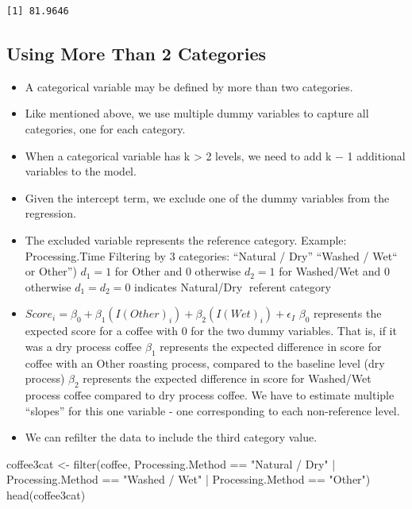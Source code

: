 \documentclass[
  letterpaper,
  DIV=11,
  numbers=noendperiod]{scrreprt}
\newenvironment{Shaded}{\begin{snugshade}}{\end{snugshade}}
\newcommand{\FunctionTok}[1]{\textcolor[rgb]{0.28,0.35,0.67}{#1}}
\newcommand{\NormalTok}[1]{\textcolor[rgb]{0.00,0.23,0.31}{#1}}
\newcommand{\OtherTok}[1]{\textcolor[rgb]{0.00,0.23,0.31}{#1}}
\newcommand{\SpecialCharTok}[1]{\textcolor[rgb]{0.37,0.37,0.37}{#1}}
\newcommand{\StringTok}[1]{\textcolor[rgb]{0.13,0.47,0.30}{#1}}
\begin{document}
\begin{verbatim}
[1] 81.9646
\end{verbatim}

\subsection{Using More Than 2
Categories}\label{using-more-than-2-categories}

\begin{itemize}
\item
  A categorical variable may be defined by more than two categories.
\item
  Like mentioned above, we use multiple dummy variables to capture all
  categories, one for each category.
\item
  When a categorical variable has k \textgreater{} 2 levels, we need to
  add k − 1 additional variables to the model.
\item
  Given the intercept term, we exclude one of the dummy variables from
  the regression.
\item
  The excluded variable represents the reference category. Example:
  Processing.Time Filtering by 3 categories: ``Natural / Dry'' ``Washed
  / Wet`` or Other'') \(d_1=1\) for Other and 0 otherwise \(d_2=1\) for
  Washed/Wet and 0 otherwise \(d_1=d_2=0\) indicates Natural/Dry
  referent category
\item
  \(Score_i=β_0+β_1(I(Other)_i)+β_2(I(Wet)_i)+ϵ_I\) \(β_0\) represents
  the expected score for a coffee with 0 for the two dummy variables.
  That is, if it was a dry process coffee \(β_1\) represents the
  expected difference in score for coffee with an Other roasting
  process, compared to the baseline level (dry process) \(β_2\)
  represents the expected difference in score for Washed/Wet process
  coffee compared to dry process coffee. We have to estimate multiple
  ``slopes'' for this one variable - one corresponding to each
  non-reference level.
\item
  We can refilter the data to include the third category value.
\end{itemize}

\begin{Shaded}
\begin{Highlighting}[]
\NormalTok{coffee3cat }\OtherTok{\textless{}{-}} \FunctionTok{filter}\NormalTok{(coffee, Processing.Method }\SpecialCharTok{==} \StringTok{"Natural / Dry"} \SpecialCharTok{|}\NormalTok{ Processing.Method }\SpecialCharTok{==}
    \StringTok{"Washed / Wet"} \SpecialCharTok{|}\NormalTok{ Processing.Method }\SpecialCharTok{==} \StringTok{"Other"}\NormalTok{)}
\FunctionTok{head}\NormalTok{(coffee3cat)}
\end{Highlighting}
\end{Shaded}
\end{document}
